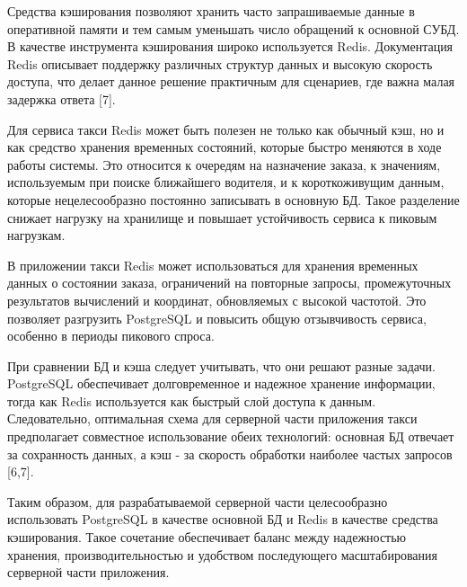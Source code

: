 {  \par \redline Средства кэширования позволяют хранить часто запрашиваемые данные в оперативной памяти и тем самым уменьшать число обращений к основной СУБД. В качестве инструмента кэширования широко используется Redis. Документация Redis описывает поддержку различных структур данных и высокую скорость доступа, что делает данное решение практичным для сценариев, где важна малая задержка ответа [7].

  \par \redline Для сервиса такси Redis может быть полезен не только как обычный кэш, но и как средство хранения временных состояний, которые быстро меняются в ходе работы системы. Это относится к очередям на назначение заказа, к значениям, используемым при поиске ближайшего водителя, и к короткоживущим данным, которые нецелесообразно постоянно записывать в основную БД. Такое разделение снижает нагрузку на хранилище и повышает устойчивость сервиса к пиковым нагрузкам.

  \par \redline В приложении такси Redis может использоваться для хранения временных данных о состоянии заказа, ограничений на повторные запросы, промежуточных результатов вычислений и координат, обновляемых с высокой частотой. Это позволяет разгрузить PostgreSQL и повысить общую отзывчивость сервиса, особенно в периоды пикового спроса.

  \par \redline При сравнении БД и кэша следует учитывать, что они решают разные задачи. PostgreSQL обеспечивает долговременное и надежное хранение информации, тогда как Redis используется как быстрый слой доступа к данным. Следовательно, оптимальная схема для серверной части приложения такси предполагает совместное использование обеих технологий: основная БД отвечает за сохранность данных, а кэш - за скорость обработки наиболее частых запросов [6,7].

  \par \redline Таким образом, для разрабатываемой серверной части целесообразно использовать PostgreSQL в качестве основной БД и Redis в качестве средства кэширования. Такое сочетание обеспечивает баланс между надежностью хранения, производительностью и удобством последующего масштабирования серверной части приложения.

  \par
}

\setcounter{subchaptercntr}{1}
\setcounter{imagecntr}{1}
